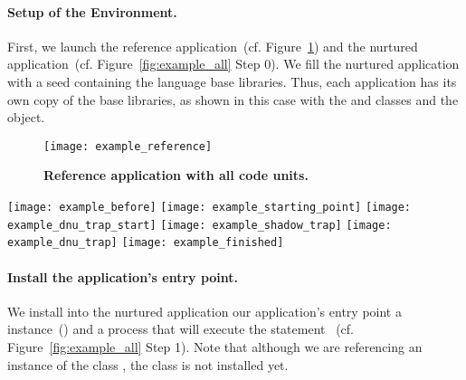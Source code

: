 \paragraph{Setup of the Environment.} First, we launch the reference application~(cf. Figure~\ref{fig:example_reference}) and the nurtured application~(cf. Figure~\ref{fig:example_all} Step 0). We fill the nurtured application with a seed containing the language base libraries. Thus, each application has its own copy of the base libraries, as shown in this case with the  and  classes and the  object.

\begin{figure}[ht]
\begin{center}
\texttt{[image: example\_reference]}
\caption{\small\textbf{Reference application with all code units.}\label{fig:example_reference}}
\end{center}
\end{figure}


\begin{figure*}[ht]
\begin{center}
\texttt{[image: example\_before]}
\texttt{[image: example\_starting\_point]}
\texttt{[image: example\_dnu\_trap\_start]}
\texttt{[image: example\_shadow\_trap]}
\texttt{[image: example\_dnu\_trap]}
\texttt{[image: example\_finished]}
\caption{\small\textbf{The nurtured application at different steps of tailoring.} \label{fig:example_all}}
\end{center}
\end{figure*}

\paragraph{Install the application's entry point.} We install into the nurtured application our application's entry point \ie a  instance~() and a process that will execute the statement ~(cf. Figure~\ref{fig:example_all} Step 1). Note that although we are referencing an instance of the class , the  class is not installed yet.


